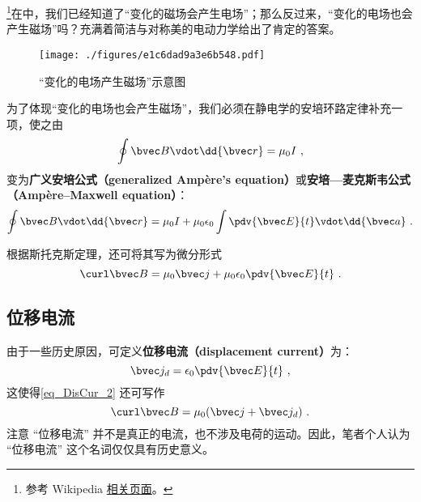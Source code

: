 
\begin{issues}
\issueDraft
\end{issues}


\footnote{参考 Wikipedia \href{https://en.wikipedia.org/wiki/Displacement_current}{相关页面}。}在中，我们已经知道了“变化的磁场会产生电场”；那么反过来，“变化的电场也会产生磁场”吗？充满着简洁与对称美的电动力学给出了肯定的答案。

\begin{figure}[ht]
\centering
\texttt{[image: ./figures/e1c6dad9a3e6b548.pdf]}
\caption{“变化的电场产生磁场”示意图} \label{fig_DisCur_1}
\end{figure}

为了体现“变化的电场也会产生磁场”，我们必须在静电学的安培环路定律补充一项，使之由
\begin{equation}
\oint \bvec B \vdot \dd{\bvec r} = \mu_0 I~,
\end{equation}
变为\textbf{广义安培公式（generalized Ampère's equation）}或\textbf{安培—麦克斯韦公式（Ampère–Maxwell equation）}：
\begin{equation}
\oint \bvec B \vdot \dd{\bvec r} = \mu_0 I + \mu_0 \epsilon_0 \int \pdv{\bvec E}{t} \vdot \dd{\bvec a}~.
\end{equation}

根据斯托克斯定理，还可将其写为微分形式
\begin{equation}\label{eq_DisCur_2}
\curl \bvec B = \mu_0 \bvec j + \mu_0\epsilon_0 \pdv{\bvec E}{t}~.
\end{equation}

\subsection{位移电流}
由于一些历史原因，可定义\textbf{位移电流（displacement current）}为：
\begin{equation}
\bvec j_d = \epsilon_0 \pdv{\bvec E}{t}~,
\end{equation}
这使得\autoref{eq_DisCur_2} 还可写作
\begin{equation}
\curl \bvec B = \mu_0 (\bvec j + \bvec j_d)~.
\end{equation}
注意 “位移电流” 并不是真正的电流，也不涉及电荷的运动。因此，笔者个人认为 “位移电流” 这个名词仅仅具有历史意义。

